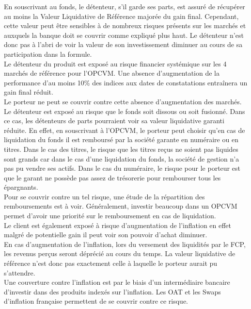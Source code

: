 \documentclass[french,12pt,a4paper]{article}
\begin{document}
\indent En souscrivant au fonds, le détenteur, s'il garde ses parts, est assuré de récupérer au moins la Valeur Liquidative de Référence majorée du gain final. Cependant, cette valeur peut être sensibles à de nombreux risques présents sur les marchés et auxquels la banque doit se couvrir comme expliqué plus haut. Le détenteur n'est donc pas à l'abri de voir la valeur de son investissement diminuer au cours de sa participation dans la formule.\\

\indent Le détenteur du produit est exposé au risque financier systémique sur les 4 marchés de référence pour l'OPCVM. Une absence d'augmentation de la performance d'au moins 10\% des indices aux dates de constatations entraînera un gain final réduit.\\
Le porteur ne peut se couvrir contre cette absence d'augmentation des marchés.\\

\indent Le détenteur est exposé au risque que le fonds soit dissous ou soit fusionné. Dans ce cas, les détenteurs de parts pourraient voir sa valeur liquidative garanti réduite. En effet, en souscrivant à l'OPCVM, le porteur peut choisir qu'en cas de liquidation du fonds il est remboursé par la société garante en numéraire ou en titres. Dans le cas des titres, le risque que les titres reçus ne soient pas liquides sont grands car dans le cas d'une liquidation du fonds, la société de gestion n'a pas pu vendre ses actifs. Dans le cas du numéraire, le risque pour le porteur est que le garant ne possède pas assez de trésorerie pour rembourser tous les épargnants. \\
Pour se couvrir contre un tel risque, une étude de la répartition des remboursements est à voir. Généralement, investir beaucoup dans un OPCVM permet d'avoir une priorité sur le remboursement en cas de liquidation. \\

\indent Le client est également exposé à risque d'augmentation de l'inflation en effet malgré de potentielle gain il peut voir son pouvoir d'achat diminuer. \\
\indent En cas d'augmentation de l'inflation, lors du versement des liquidités par le FCP, les revenus perçus seront déprécié au cours du temps. La valeur liquidative de référence n'est donc pas exactement celle à laquelle le porteur aurait pu s'attendre.\\
\indent Une couverture contre l'inflation est par le biais d'un intermédiaire bancaire d'investir dans des produits indexés sur l'inflation. Les OAT et les Swaps d'inflation française permettent de se couvrir contre ce risque.\\
\end{document}
